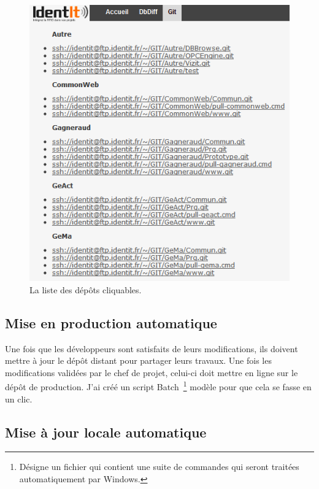 \begin{figure}
    \begin{center}
        \includegraphics[scale=0.7]{images/repo.png}
        \caption{La liste des dépôts cliquables.}
        \label{repo}
    \end{center}
\end{figure}

\newpage

\subsection{Mise en production automatique} %
\label{sub:Mise en production automatique}

Une fois que les développeurs sont satisfaits de leurs modifications,
ils doivent mettre à jour le dépôt distant pour partager leurs travaux.
Une fois les modifications validées par le chef de projet, celui-ci doit
mettre en ligne sur le dépôt de production. J'ai créé un script Batch\,
\footnote{Désigne un fichier qui contient une suite de commandes qui
seront traitées automatiquement par Windows.} \og modèle \fg{} pour
que cela se fasse en un clic.

\subsection{Mise à jour locale automatique} %
\label{sub:Mise à jour locale automatique}

